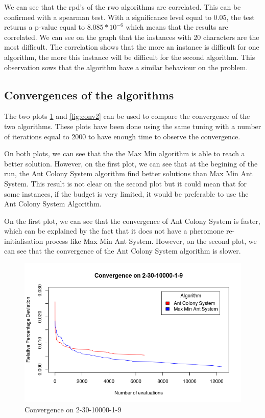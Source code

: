 \documentclass{article}
\begin{document}
We can see that the rpd's of the rwo algorithms are correlated.
This can be confirmed with a spearman test.
With a significance level equal to $0.05$, the test returns a p-value equal to $8.085*10^{-6}$ which means that the results are correlated.
We can see on the graph that the instances with 20 characters are the most difficult.
The correlation shows that the more an instance is difficult for one algorithm, the more this instance will be difficult for the second algorithm.
This observation sows that the algorithm have a similar behaviour on the problem.

\subsection{Convergences of the algorithms}

The two plots \ref{fig:conv1} and \ref{fig:conv2} can be used to compare the convergence of the two algorithms.
These plots have been done using the same tuning with a number of iterations equal to 2000 to have enough time to observe the convergence.\newline

On both plots, we can see that the the Max Min algorithm is able to reach a better solution.
However, on the first plot, we can see that at the begining of the run, the Ant Colony System algorithm find better solutions than Max Min Ant System.
This result is not clear on the second plot but it could mean that for some instances, if the budget is very limited, it would be preferable to use the Ant Colony System Algorithm. \newline

On the first plot, we can see that the convergence of Ant Colony System is faster, which can be explained by the fact that it does not have a pheromone re-initialisation process like Max Min Ant System.
However, on the second plot, we can see that the convergence of the Ant Colony System algorithm is slower.

\begin{figure}
    \centering
        \includegraphics[scale=0.5]{conv-2-30}
    \caption{Convergence on 2-30-10000-1-9}
    \label{fig:conv1}
\end{figure}
\end{document}
